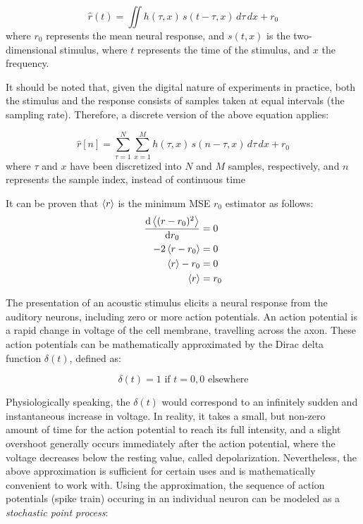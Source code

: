 \begin{equation}\label{impulse response}
	\hat{r}(t) = \iint h(\tau, x)\, s(t - \tau, x)\, d\tau\, dx + r_0
\end{equation}
\noindent where $r_0$ represents the mean neural response, and $s(t, x)$ is the two-dimensional stimulus, where $t$ represents the time of the stimulus, and $x$ the frequency.

It should be noted that, given the digital nature of experiments in practice, both the stimulus and the response consists of samples taken at equal intervals (the sampling rate). Therefore, a discrete version of the above equation applies:

\begin{equation}
\hat{r}[n] = \sum_{\tau=1}^N \sum_{x=1}^M h(\tau, x)\, s(n - \tau, x)\, d\tau\, dx + r_0
\end{equation}
\noindent where $\tau$ and $x$ have been discretized into $N$ and $M$ samples, respectively, and $n$ represents the sample index, instead of continuous time

It can be proven that $\left\langle r \right\rangle$ is the minimum MSE $r_0$ estimator as follows:
\begin{align*}
	\dv{\left\langle (r - r_0)^2 \right\rangle}{r_0} &= 0 \\
	-2\left\langle r-r_0 \right\rangle &= 0 \\
	\left\langle r \right\rangle - r_0 &= 0 \\
	\left\langle r \right\rangle &= r_0
\end{align*}

The presentation of an acoustic stimulus elicits a neural response from the auditory neurons, including zero or more action potentials. An action potential is a rapid change in voltage of the cell membrane, travelling across the axon. These action potentials can be mathematically approximated by the Dirac delta function $\delta(t)$, defined as:

\begin{equation}
	\delta(t) = 1 \textrm{ if } t=0, 0 \textrm{ elsewhere} 
\end{equation}

Physiologically speaking, the $\delta(t)$ would correspond to an infinitely sudden and instantaneous increase in voltage. In reality, it takes a small, but non-zero amount of time for the action potential to reach its full intensity, and a slight overshoot generally occurs immediately after the action potential, where the voltage decreases below the resting value, called depolarization. Nevertheless, the above approximation is sufficient for certain uses and is mathematically convenient to work with. Using the approximation, the sequence of action potentials (spike train) occuring in an individual neuron can be modeled as a \emph{stochastic point process}:

